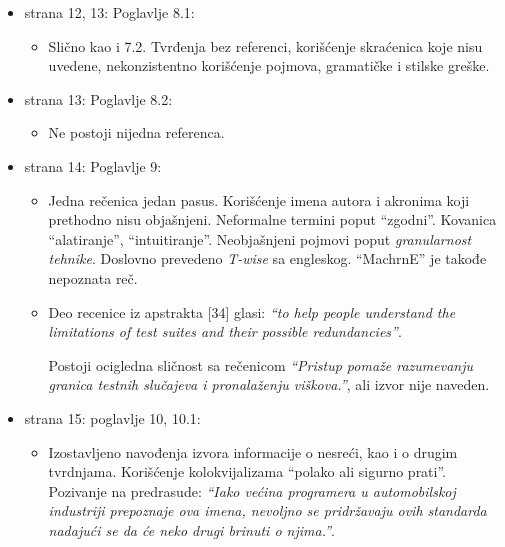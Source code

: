 \documentclass[a4paper]{report}
\begin{document}
\begin{itemize}
\item strana 12, 13: Poglavlje 8.1:
  \begin{itemize}
  \item Slično kao i 7.2. Tvrđenja bez referenci, korišćenje skraćenica koje nisu uvedene, nekonzistentno korišćenje pojmova, gramatičke i stilske greške.
  \end{itemize}
\end{itemize}


\begin{itemize}
\item strana 13: Poglavlje 8.2:
  \begin{itemize}
    \item Ne postoji nijedna referenca.
  \end{itemize}
\end{itemize}

\begin{itemize}
\item strana 14: Poglavlje 9:
  \begin{itemize}
  \item Jedna rečenica jedan pasus. Korišćenje imena autora i akronima koji prethodno nisu objašnjeni. Neformalne termini poput ``zgodni''. Kovanica ``alatiranje'', ``intuitiranje''. Neobjašnjeni pojmovi poput {\em{granularnost tehnike}}. Doslovno prevedeno {\em{T-wise}} sa engleskog. ``MachrnE'' je takođe nepoznata reč.
  \item Deo recenice iz apstrakta [34] glasi:
    {\em{``to help people understand the limitations of test suites   and their possible redundancies''}}.

    Postoji ocigledna sličnost sa rečenicom {\em{``Pristup pomaže razumevanju granica testnih slučajeva i pronalaženju viškova.''}}, ali izvor nije naveden.
  \end{itemize}
\end{itemize}

\begin{itemize}
\item strana 15: poglavlje 10, 10.1:
  \begin{itemize}
  \item Izostavljeno navođenja izvora informacije o nesreći, kao i o drugim tvrdnjama. Korišćenje kolokvijalizama ``polako ali sigurno prati''. Pozivanje na predrasude: {\em{``Iako većina programera u automobilskoj industriji prepoznaje ova imena, nevoljno se pridržavaju ovih standarda nadajući se da će neko drugi brinuti o njima.''}}.
  \end{itemize}
\end{itemize}
\end{document}
